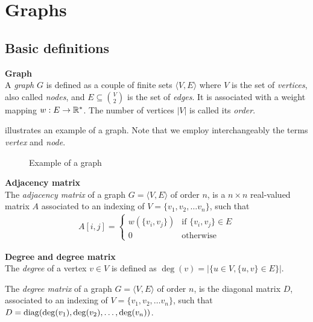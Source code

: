 \section{Graphs}

\subsection{Basic definitions}

\begin{definition}\textbf{Graph}\\
A \emph{graph} $G$ is defined as a couple of finite sets $\langle V,E \rangle$ where $V$ is the set of \emph{vertices}, also called \emph{nodes}, and $E \subseteq\binom{V}{2}$ is the set of \emph{edges}. It is associated with a weight mapping $w: E \rightarrow \mathbb{R}^*$. The number of vertices $|V|$ is called its \emph{order}.
\end{definition}

 illustrates an example of a graph. Note that we employ interchangeably the terms \emph{vertex} and \emph{node}.

\begin{figure}[H]
\centering
{}
\caption{Example of a graph}
\label{fig:graph}
\end{figure}

\begin{definition}\textbf{Adjacency matrix}\\
The \emph{adjacency matrix} of a graph $G = \langle V,E \rangle$ of order $n$, is a $n \times n$ real-valued matrix $A$ associated to an indexing of $V = \{v_1, v_2, \ldots v_n\}$, such that
\begin{gather*}
A[i,j] =
 \begin{cases}
   w\left(\{v_i,v_j\}\right) & \text{if } \{v_i,v_j\} \in E \\
   0 & \text{otherwise}
 \end{cases}
\end{gather*}
 \end{definition}

\begin{definition}\textbf{Degree and degree matrix}\\
The \emph{degree} of a vertex $v \in V$ is defined as $\deg(v) = |\{u \in V, \{u,v\} \in E\}|$.

The \emph{degree matrix} of a graph $G = \langle V,E \rangle$ of order $n$, is the diagonal matrix $D$, associated to an indexing of $V = \{v_1, v_2, \ldots v_n\}$, such that $D = \operatorname{diag}(\deg(v_1), \deg(v_2), \ldots, \deg(v_n))$.
\end{definition}

